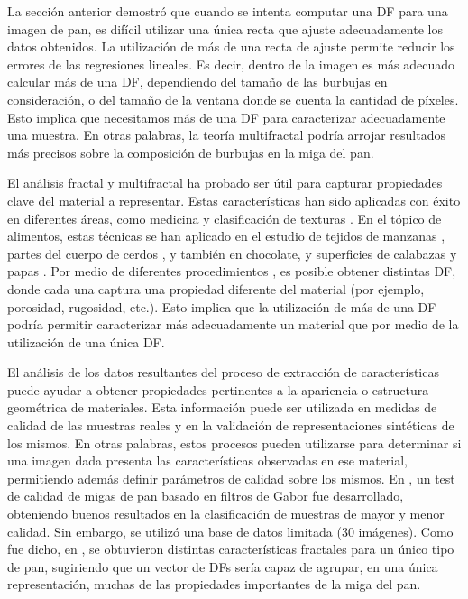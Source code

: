 La sección anterior demostró que cuando se intenta computar una DF para una imagen de pan, es difícil utilizar una única recta que ajuste adecuadamente los datos obtenidos.
La utilización de más de una recta de ajuste permite reducir los errores de las regresiones lineales.
Es decir, dentro de la imagen es más adecuado calcular más de una DF, dependiendo del tamaño de las burbujas en consideración, o del tamaño de la ventana donde se cuenta la cantidad de píxeles.
Esto implica que necesitamos más de una DF para caracterizar adecuadamente una muestra.
En otras palabras, la teoría multifractal podría arrojar resultados más precisos sobre la composición de burbujas en la miga del pan.

El análisis fractal y multifractal ha probado ser útil para capturar propiedades clave del material a representar.
Estas características han sido aplicadas con éxito en diferentes áreas, como medicina \cite{Andjelkovic2008,Yu2011} y clasificación de texturas \cite{Wendt2009}.
En el tópico de alimentos, estas técnicas se han aplicado en el estudio de tejidos de manzanas \cite{Mendoza2010}, partes del cuerpo de cerdos \cite{Serrano2012}, y también en chocolate, y superficies de calabazas y papas \cite{Quevedo2002}.
Por medio de diferentes procedimientos \cite{Gonzales2008,Peitgen2004}, es posible obtener distintas DF, donde cada una captura una propiedad diferente del material (por ejemplo, porosidad, rugosidad, etc.).
Esto implica que la utilización de más de una DF podría permitir caracterizar más adecuadamente un material que por medio de la utilización de una única DF.

El análisis de los datos resultantes del proceso de extracción de características puede ayudar a obtener propiedades pertinentes a la apariencia o estructura geométrica de materiales.
Esta información puede ser utilizada en medidas de calidad de las muestras reales y en la validación de representaciones sintéticas de los mismos.
En otras palabras, estos procesos pueden utilizarse para determinar si una imagen dada presenta las características observadas en ese material, permitiendo además definir parámetros de calidad sobre los mismos.
En \cite{Fan2006}, un test de calidad de migas de pan basado en filtros de Gabor fue desarrollado, obteniendo buenos resultados en la clasificación de muestras de mayor y menor calidad.
Sin embargo, se utilizó una base de datos limitada ($30$ imágenes).
Como fue dicho, en \cite{Gonzales2008}, se obtuvieron distintas características fractales para un único tipo de pan, sugiriendo que un vector de DFs sería capaz de agrupar, en una única representación, muchas de las propiedades importantes de la miga del pan.

